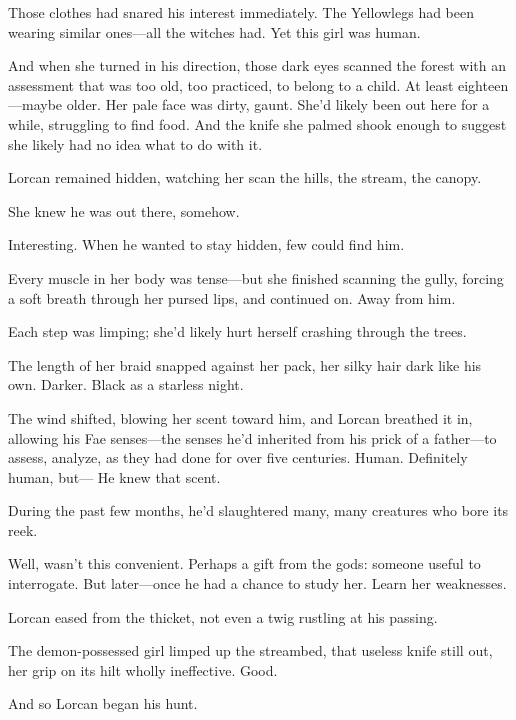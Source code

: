 Those clothes had snared his interest immediately.
The Yellowlegs had been wearing similar ones---all the witches had.
Yet this girl was human.

And when she turned in his direction, those dark eyes scanned the forest with an assessment that was too old, too practiced, to belong to a child.
At least eighteen---maybe older.
Her pale face was dirty, gaunt.
She'd likely been out here for a while, struggling to find food.
And the knife she palmed shook enough to suggest she likely had no idea what to do with it.

Lorcan remained hidden, watching her scan the hills, the stream, the canopy.

She knew he was out there, somehow.

Interesting.
When he wanted to stay hidden, few could find him.

Every muscle in her body was tense---but she finished scanning the gully, forcing a soft breath through her pursed lips, and continued on.
Away from him.

Each step was limping; she'd likely hurt herself crashing through the trees.

The length of her braid snapped against her pack, her silky hair dark like his own.
Darker.
Black as a starless night.

The wind shifted, blowing her scent toward him, and Lorcan breathed it in, allowing his Fae senses---the senses he'd inherited from his prick of a father---to assess, analyze, as they had done for over five centuries.
Human.
Definitely human, but--- He knew that scent.

During the past few months, he'd slaughtered many, many creatures who bore its reek.

Well, wasn't this convenient.
Perhaps a gift from the gods: someone useful to interrogate.
But later---once he had a chance to study her.
Learn her weaknesses.

Lorcan eased from the thicket, not even a twig rustling at his passing.

The demon-possessed girl limped up the streambed, that useless knife still out, her grip on its hilt wholly ineffective.
Good.

And so Lorcan began his hunt.
